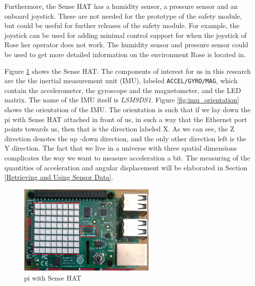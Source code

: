 \documentclass[12pt]{scrreprt}
\begin{document}
Furthermore, the Sense HAT has a humidity sensor, a  pressure sensor and an onboard joystick. These are not needed for the prototype of the safety module, but could be useful for further releases of the safety module. For example, the joystick can be used for adding minimal control support for when the joystick of Rose her operator does not work. The humidity sensor and pressure sensor could be used to get more detailed information on the environment Rose is located in.
\par
Figure \ref{fig:sensehat} shows the Sense HAT. The components of interest for us in this research are the the inertial measurement unit (IMU), labeled \texttt{ACCEL/GYRO/MAG}, which contain the accelerometer, the gyroscope and the magnetometer, and the LED matrix. The name of the IMU itself is \textit{LSM9DS1}. Figure \ref{fig:imu_orientation} shows the orientation of the IMU. The orientation is such that if we lay down the \gls{pi} with Sense HAT attached in front of us, in such a way that the Ethernet port points towards us, then that is the direction labeled X. As we can see, the Z direction denotes the up -down direction, and the only other direction left is the Y direction. The fact that we live in a universe with three spatial dimensions complicates the way we want to measure acceleration a bit. The measuring of the quantities of acceleration and angular displacement will be elaborated in Section \ref{Retrieving and Using Sensor Data}.

\begin{figure}[H]
    \centering
    \includegraphics[width=0.6\textwidth]{Figures/results/sense_hat_self_dia.png}
    \caption{\gls{pi} with Sense HAT}
    \label{fig:sensehat}
\end{figure}
\end{document}
